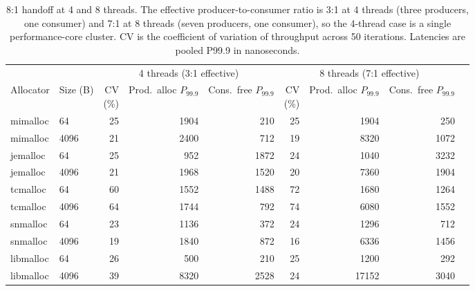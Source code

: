 \begin{table}[!htbp]
\centering
\scriptsize
\setlength{\tabcolsep}{3pt}
\caption{8:1 handoff at 4 and 8 threads. The effective producer-to-consumer ratio is 3:1 at 4 threads (three producers, one consumer) and 7:1 at 8 threads (seven producers, one consumer), so the 4-thread case is a single performance-core cluster. CV is the coefficient of variation of throughput across 50 iterations. Latencies are pooled P99.9 in nanoseconds.}
\label{tab:pcore}
\begin{tabular}{llrrrrrrr}
\toprule
& & \multicolumn{3}{c}{4 threads (3:1 effective)} & \multicolumn{3}{c}{8 threads (7:1 effective)}\\
\cmidrule(lr){3-5}\cmidrule(lr){6-8}
Allocator & Size (B) & \shortstack{CV\\(\%)} & \shortstack{Prod.\ alloc\\$P_{99.9}$} & \shortstack{Cons.\ free\\$P_{99.9}$} & \shortstack{CV\\(\%)} & \shortstack{Prod.\ alloc\\$P_{99.9}$} & \shortstack{Cons.\ free\\$P_{99.9}$}\\
\midrule
mimalloc & 64 & 25 & 1904 & 210 & 25 & 1904 & 250 \\
mimalloc & 4096 & 21 & 2400 & 712 & 19 & 8320 & 1072 \\
jemalloc & 64 & 25 & 952 & 1872 & 24 & 1040 & 3232 \\
jemalloc & 4096 & 21 & 1968 & 1520 & 20 & 7360 & 1904 \\
tcmalloc & 64 & 60 & 1552 & 1488 & 72 & 1680 & 1264 \\
tcmalloc & 4096 & 64 & 1744 & 792 & 74 & 6080 & 1552 \\
snmalloc & 64 & 23 & 1136 & 372 & 24 & 1296 & 712 \\
snmalloc & 4096 & 19 & 1840 & 872 & 16 & 6336 & 1456 \\
libmalloc & 64 & 26 & 500 & 210 & 25 & 1200 & 292 \\
libmalloc & 4096 & 39 & 8320 & 2528 & 24 & 17152 & 3040 \\
\bottomrule
\end{tabular}
\end{table}
